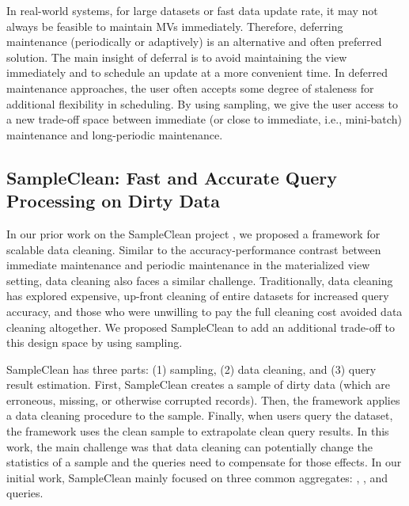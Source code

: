 In real-world systems, for large datasets or fast data update rate, it may not always be feasible to maintain MVs immediately. 
Therefore, deferring maintenance (periodically or adaptively) is an alternative and often preferred solution.
The main insight of deferral is to avoid maintaining the view immediately and to schedule an update at a more convenient time.
In deferred maintenance approaches, the user often accepts some degree of staleness for additional flexibility in scheduling.
By using sampling, we give the user access to a new trade-off space between immediate (or close to immediate, i.e., mini-batch) maintenance and long-periodic maintenance.

\fi


\subsection{SampleClean: Fast and Accurate Query Processing on Dirty Data}
In our prior work on the SampleClean project \cite{wang1999sample}, we proposed a framework for scalable data cleaning.
Similar to the accuracy-performance contrast between immediate maintenance and periodic maintenance in the materialized view setting, data cleaning also faces a similar challenge.
Traditionally, data cleaning has explored expensive, up-front cleaning of entire datasets for increased query accuracy, and those who were unwilling to pay the full cleaning cost avoided data cleaning altogether.
We proposed SampleClean to add an additional trade-off to this design space by using sampling.

SampleClean has three parts: (1) sampling, (2) data cleaning, and (3) query result estimation.
First, SampleClean creates a sample of dirty data (which are erroneous, missing, or otherwise corrupted records).
Then, the framework applies a data cleaning procedure to the sample.
Finally, when users query the dataset, the framework uses the clean sample to extrapolate clean query results.
In this work, the main challenge was that data cleaning can potentially change the statistics of a sample and the queries need to compensate for those effects.
In our initial work, SampleClean mainly focused on three common aggregates: \sumfunc, \avgfunc, and \countfunc queries.

